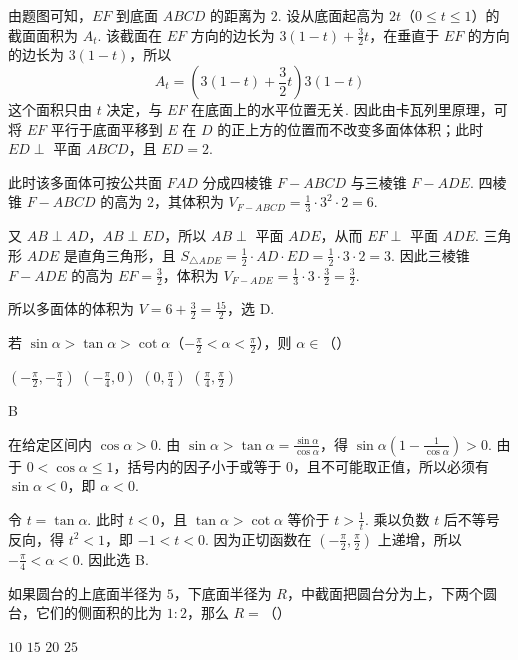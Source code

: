 \begin{solution}
由题图可知，\(EF\) 到底面 \(ABCD\) 的距离为 \(2\). 设从底面起高为 \(2t\)（\(0\leqslant t\leqslant1\)）的截面面积为 \(A_t\). 该截面在 \(EF\) 方向的边长为 \(3(1-t)+\frac32t\)，在垂直于 \(EF\) 的方向的边长为 \(3(1-t)\)，所以
\[
A_t=\left(3(1-t)+\frac32t\right)3(1-t)
\]
这个面积只由 \(t\) 决定，与 \(EF\) 在底面上的水平位置无关. 因此由卡瓦列里原理，可将 \(EF\) 平行于底面平移到 \(E\) 在 \(D\) 的正上方的位置而不改变多面体体积；此时 \(ED\perp\) 平面 \(ABCD\)，且 \(ED=2\).

此时该多面体可按公共面 \(FAD\) 分成四棱锥 \(F-ABCD\) 与三棱锥 \(F-ADE\). 四棱锥 \(F-ABCD\) 的高为 \(2\)，其体积为
\(V_{F-ABCD}=\frac13\cdot3^2\cdot2=6\).

又 \(AB\perp AD\)，\(AB\perp ED\)，所以 \(AB\perp\) 平面 \(ADE\)，从而 \(EF\perp\) 平面 \(ADE\). 三角形 \(ADE\) 是直角三角形，且
\(S_{\triangle ADE}=\frac12\cdot AD\cdot ED=\frac12\cdot3\cdot2=3\).
因此三棱锥 \(F-ADE\) 的高为 \(EF=\frac32\)，体积为
\(V_{F-ADE}=\frac13\cdot3\cdot\frac32=\frac32\).

所以多面体的体积为
\(V=6+\frac32=\frac{15}{2}\)，选 D.
\end{solution}

\begin{problem}
若 \(\sin\alpha>\tan\alpha>\cot\alpha\)（\(-\frac{\pi}{2}<\alpha<\frac{\pi}{2}\)），则 \(\alpha\in\)（\quad）

\choices
    {\(\left(-\frac{\pi}{2},-\frac{\pi}{4}\right)\)}
    {\(\left(-\frac{\pi}{4},0\right)\)}
    {\(\left(0,\frac{\pi}{4}\right)\)}
    {\(\left(\frac{\pi}{4},\frac{\pi}{2}\right)\)}
\end{problem}

\begin{answer}
B
\end{answer}

\begin{solution}
在给定区间内 \(\cos\alpha>0\). 由
\(\sin\alpha>\tan\alpha=\frac{\sin\alpha}{\cos\alpha}\)，得
\(\sin\alpha\left(1-\frac1{\cos\alpha}\right)>0\).
由于 \(0<\cos\alpha\leqslant1\)，括号内的因子小于或等于 \(0\)，且不可能取正值，所以必须有 \(\sin\alpha<0\)，即 \(\alpha<0\).

令 \(t=\tan\alpha\). 此时 \(t<0\)，且 \(\tan\alpha>\cot\alpha\) 等价于 \(t>\frac{1}{t}\). 乘以负数 \(t\) 后不等号反向，得 \(t^2<1\)，即 \(-1<t<0\). 因为正切函数在 \((-\frac\pi2,\frac\pi2)\) 上递增，所以
\(-\frac\pi4<\alpha<0\). 因此选 B.
\end{solution}

\begin{problem}
如果圆台的上底面半径为 \(5\)，下底面半径为 \(R\)，中截面把圆台分为上，下两个圆台，它们的侧面积的比为 \(1:2\)，那么 \(R=\)（\quad）

\choices
    {\(10\)}
    {\(15\)}
    {\(20\)}
    {\(25\)}
\end{problem}

